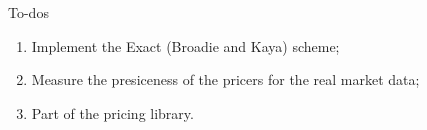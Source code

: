 \documentclass[aspectratio=169]{beamer}
\begin{document}
        \begin{frame}{To-dos}
            \begin{enumerate}
                \item Implement the Exact (Broadie and Kaya) scheme;
                \item Measure the presiceness of the pricers for the real market data;
                \item Part of the pricing library.
            \end{enumerate}
        \end{frame}
\end{document}
